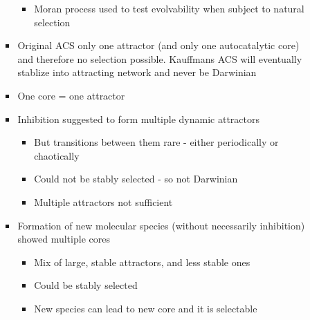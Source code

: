 \begin{itemize}
\begin{itemize}
\begin{itemize}
\begin{itemize}
						\item
						
						Moran process used to test evolvability when subject to natural
						selection
						
					\end{itemize}
					\item
					
					Original ACS only one attractor (and only one autocatalytic core)
					and therefore no selection possible. Kauffmans ACS will eventually
					stablize into attracting network and never be Darwinian
					
					\item
					
					One core = one attractor
					
					\item
					
					Inhibition suggested to form multiple dynamic attractors
					
					
					\begin{itemize}
						\item
						
						But transitions between them rare - either periodically or
						chaotically
						
						\item
						
						Could not be stably selected - so not Darwinian
						
						\item
						
						Multiple attractors not sufficient
						
					\end{itemize}
					\item
					
					Formation of new molecular species (without necessarily
					inhibition) showed multiple cores
					
					
					\begin{itemize}
						\item
						
						Mix of large, stable attractors, and less stable ones
						
						\item
						
						Could be stably selected
						
						\item
						
						New species can lead to new core and it is selectable
						

\end{itemize}
\end{itemize}
\end{itemize}
\end{itemize}
